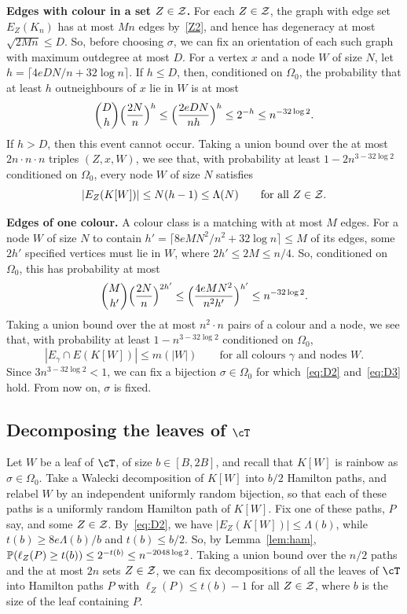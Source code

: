 \smallskip

\noindent\textbf{Edges with colour in a set $Z\in\mathcal{Z}$.}
For each $Z\in\mathcal{Z}$, the graph with edge set $E_Z(K_n)$ has at most $Mn$ edges by~\ref{Z2}, and hence has degeneracy at most $\sqrt{2Mn}\leq D$. So, before choosing $\sigma$, we can fix an orientation of each such graph with maximum outdegree at most $D$.
For a vertex $x$ and a node $W$ of size $N$, let $h=\lceil4eDN/n+32\log n\rceil$. If $h\le D$, then, conditioned on $\Omega_0$, the probability that at least $h$ outneighbours of $x$ lie in $W$ is at most
\[
\binom Dh\Bigl(\frac{2N}n\Bigr)^h\le\Bigl(\frac{2eDN}{nh}\Bigr)^h\le2^{-h}\le n^{-32\log 2}.
\]
If $h>D$, then this event cannot occur. Taking a union bound over the at most $2n\cdot n\cdot n$ triples $(Z,x,W)$, we see that, with probability at least $1-2n^{3-32\log2}$ conditioned on $\Omega_0$, every node $W$ of size $N$ satisfies
\begin{equation}\label{eq:D2}
|E_Z(K[W])|\le N(h-1)\le\Lambda(N)\qquad\text{for all }Z\in\mathcal{Z}.
\end{equation}

\noindent\textbf{Edges of one colour.}
A colour class is a matching with at most $M$ edges. For a node $W$ of size $N$ to contain $h'=\lceil8eMN^2/n^2+32\log n\rceil\le M$ of its edges, some $2h'$ specified vertices must lie in $W$, where $2h'\le2M\le n/4$. So, conditioned on $\Omega_0$, this has probability at most
\[
\binom M{h'}\Bigl(\frac{2N}n\Bigr)^{2h'}\le\Bigl(\frac{4eMN^2}{n^2h'}\Bigr)^{h'}\le n^{-32\log2}.
\]
Taking a union bound over the at most $n^2\cdot n$ pairs of a colour and a node, we see that, with probability at least $1-n^{3-32\log 2}$ conditioned on $\Omega_0$,
\begin{equation}\label{eq:D3}
|E_\gamma\cap E(K[W])|\le m(|W|)\qquad\text{for all colours }\gamma\text{ and nodes }W.
\end{equation}
Since $3n^{3-32\log2}<1$, we can fix a bijection $\sigma\in\Omega_0$ for which~\eqref{eq:D2} and~\eqref{eq:D3} hold. From now on, $\sigma$ is fixed.

\subsection{Decomposing the leaves of $\cT$}\label{sec:leaves}
Let $W$ be a leaf of $\cT$, of size $b\in[B,2B]$, and recall that $K[W]$ is rainbow as $\sigma\in \Omega_0$.
Take a Walecki decomposition of $K[W]$ into $b/2$ Hamilton paths, and relabel $W$ by an independent uniformly random bijection, so that each of these paths is a uniformly random Hamilton path of $K[W]$.
Fix one of these paths, $P$ say, and some $Z\in\mathcal{Z}$. By~\eqref{eq:D2}, we have $|E_Z(K[W])|\le\Lambda(b)$, while $t(b)\ge 8e\Lambda(b)/b$ and $t(b)\le b/2$. So, by Lemma~\ref{lem:ham}, $\mathbb{P}(\ell_Z(P)\ge t(b))\le2^{-t(b)}\le n^{-2048\log 2}$.
Taking a union bound over the $n/2$ paths and the at most $2n$ sets $Z\in \mathcal{Z}$, we can fix decompositions of all the leaves of $\cT$ into Hamilton paths $P$ with $\ell_Z(P)\le t(b)-1$ for all $Z\in\mathcal{Z}$, where $b$ is the size of the leaf containing $P$.


